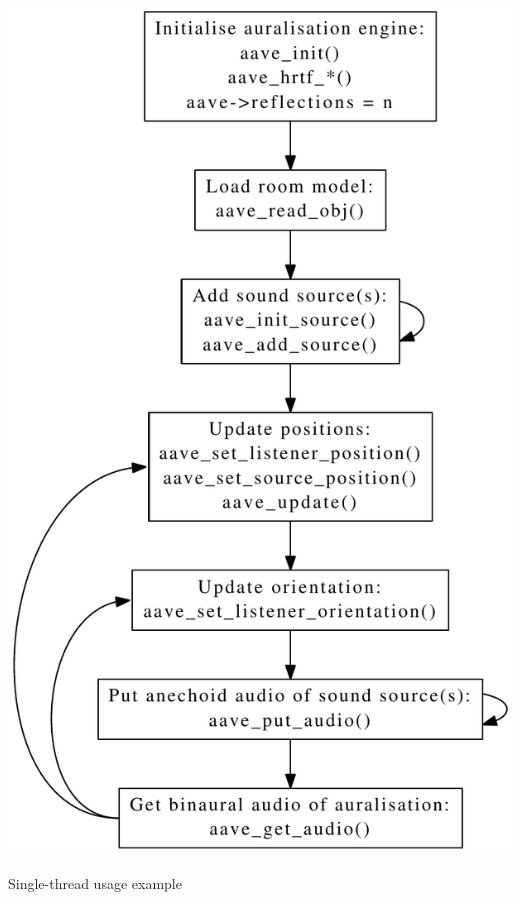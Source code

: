 \begin{DoxyImage}
\includegraphics{usage1}
\caption{Single-\/thread usage example}
\end{DoxyImage}
 

